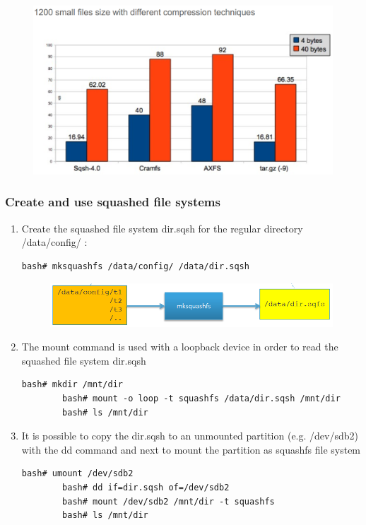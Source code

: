 \documentclass[resume]{subfiles}
\begin{document}
\begin{figure}[H]
    \centering
    \includegraphics[width=1\columnwidth]{Figures/fileSystem/squashSystPerf.png}
    \label{fig:squashSystPerf}
\end{figure}

\subsubsection{Create and use squashed file systems}
\begin{enumerate}
    \item Create the squashed file system dir.sqsh for the regular directory /data/config/ :
    \begin{lstlisting}[style=console,label={},caption={}]
        bash# mksquashfs /data/config/ /data/dir.sqsh
    \end{lstlisting}
    \begin{figure}[H]
        \centering
        \includegraphics[width=1\columnwidth]{Figures/fileSystem/msquashfsCom.png}
        \label{fig:msquashfsCom}
    \end{figure}
    \item The mount command is used with a loopback device in order to read the squashed file system dir.sqsh
    \begin{lstlisting}[style=console,label={},caption={}]
        bash# mkdir /mnt/dir
        bash# mount -o loop -t squashfs /data/dir.sqsh /mnt/dir
        bash# ls /mnt/dir
    \end{lstlisting}
    \item It is possible to copy the dir.sqsh to an unmounted partition (e.g. /dev/sdb2) with the dd command and next to mount the partition as squashfs file system
    \begin{lstlisting}[style=console,label={},caption={}]
        bash# umount /dev/sdb2
        bash# dd if=dir.sqsh of=/dev/sdb2
        bash# mount /dev/sdb2 /mnt/dir -t squashfs
        bash# ls /mnt/dir
    \end{lstlisting}
\end{enumerate}
\end{document}
